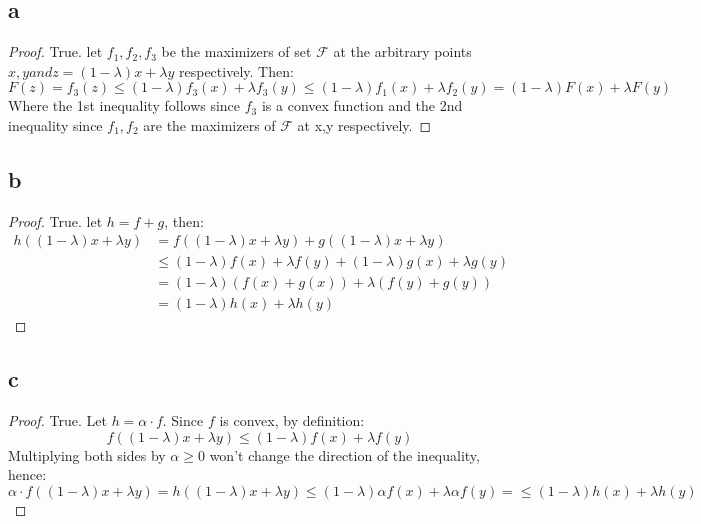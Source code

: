 \subsection*{a}
\begin{proof}    
    True. let $f_1, f_2, f_3$ be the maximizers of set $\mathcal{F}$ at the arbitrary points $x, y and z=(1-\lambda)x + \lambda y$ respectively. Then:
    \begin{equation*}
        F(z) = f_3(z) \leq (1-\lambda)f_3(x) + \lambda f_3(y) \leq (1-\lambda)f_1(x) + \lambda f_2(y) = (1-\lambda)F(x) + \lambda F(y)
    \end{equation*}
    Where the 1st inequality follows since $f_3$ is a convex function and the 2nd inequality since $f_1, f_2$ are the maximizers of $\mathcal{F}$ at x,y respectively.
\end{proof}

\subsection*{b}
\begin{proof}    
    True. let $h = f + g$, then:
    \begin{equation*}
        \begin{split}
            h((1-\lambda)x + \lambda y) &= f((1-\lambda)x + \lambda y) + g((1-\lambda)x + \lambda y) \\
            &\leq (1-\lambda)f(x) + \lambda f(y) + (1-\lambda)g(x) + \lambda g(y) \\
            &= (1-\lambda)(f(x) + g(x)) + \lambda (f(y) + g(y)) \\
            &= (1-\lambda)h(x) + \lambda h(y)             
        \end{split}
    \end{equation*}
\end{proof}

\subsection*{c}
\begin{proof}    
    True. Let $h = \alpha \cdot f$. Since $f$ is convex, by definition:
    \begin{equation*}
        f((1-\lambda)x + \lambda y) \leq (1-\lambda)f(x) + \lambda f(y)
    \end{equation*}
    Multiplying both sides by $\alpha \geq 0$ won't change the direction of the inequality, hence:
    \begin{equation*}
        \alpha \cdot f((1-\lambda)x + \lambda y) = h((1-\lambda)x + \lambda y) \leq (1-\lambda) \alpha f(x) + \lambda \alpha f(y) = \leq (1-\lambda) h(x) + \lambda h(y)
    \end{equation*}    
\end{proof}

